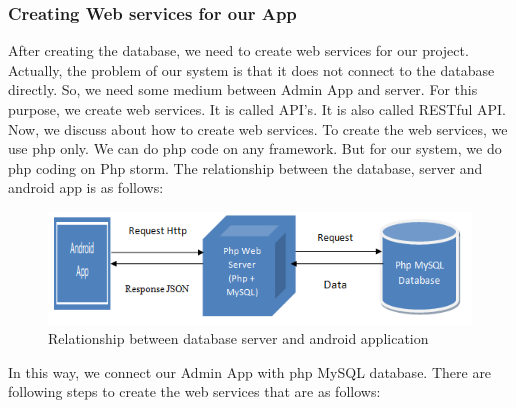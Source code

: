 \clearpage

\subsubsection{Creating Web services for our App}

After creating the database, we need to create web services for our project. Actually, the problem of our system is that it does not connect to the database directly. So, we need some medium between Admin App and server. For this purpose, we create web services. It is called API’s. It is also called RESTful API.
Now, we discuss about how to create web services. To create the web services, we use php only. We can do php code on any framework. But for our system, we do php coding on Php storm. The relationship between the database, server and android app is as follows: 
\begin{figure}[h]
  		\centering
    		\includegraphics{./Figures/relation}
\caption{Relationship between database server and android application}
\label{fig:14}
 		\end{figure}

In this way, we connect our Admin App with php MySQL database. There are following steps to create the web services that are as follows:


